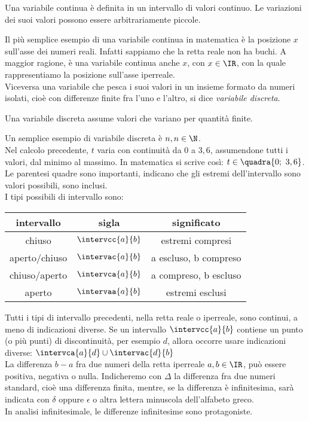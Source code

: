 \begin{definizione}
 Una variabile continua è definita in un intervallo di valori continuo.
 Le variazioni dei suoi valori possono essere arbitrariamente piccole.
\end{definizione}

Il più semplice esempio di una variabile continua in matematica è la 
posizione $x$ sull'asse dei numeri reali. Infatti sappiamo che la retta reale 
non
ha buchi. A maggior ragione, è una variabile continua anche $x$, con $x\in\IR$,
con la quale rappresentiamo la posizione sull'asse iperreale. \\
Viceversa una variabile che pesca i suoi valori in un insieme formato da 
numeri isolati,
cioè con differenze finite fra l'uno e l'altro, si dice \emph{variabile 
discreta}. 
\begin{definizione}
 Una variabile discreta assume valori che variano per quantità finite.
\end{definizione}

Un semplice esempio di variabile discreta è $n, n\in \N$.\\
Nel calcolo precedente, $t$ varia con continuità da $0$ a $3,6$,
assumendone tutti i valori, dal minimo al massimo. In matematica si scrive 
così:
\(t\in \quadra{0;\ 3,6}\). Le parentesi quadre sono importanti, indicano che 
gli estremi
dell'intervallo sono valori possibili, sono inclusi.\\
I tipi possibili di intervallo sono:

\begin{center}
\begin{tabular}{ccc}\toprule
intervallo & sigla & significato\\\midrule
chiuso &$\intervcc{a}{b}$  & estremi compresi\\
aperto/chiuso & $\intervac{a}{b}$ & a escluso, b compreso\\
chiuso/aperto & $\intervca{a}{b}$ & a compreso, b escluso\\
aperto & $\intervaa{a}{b}$ & estremi esclusi\\\bottomrule
\end{tabular}
\label{tab:diff_tipiinterv}
\end{center}

Tutti i tipi di intervallo precedenti, nella retta reale o iperreale, sono
continui, a meno di indicazioni diverse. Se un intervallo $\intervcc{a}{b}$ 
contiene un punto
(o più punti) di discontinuità, per esempio $d$, allora occorre usare 
indicazioni
diverse: $\intervca{a}{d}\cup\intervac{d}{b}$\\ 
La differenza $b-a$ fra due numeri della retta iperreale $a, b \in \IR$, 
può essere positiva, negativa o nulla. Indicheremo con $\Delta$ la 
differenza fra due numeri standard, cioè una differenza finita, mentre, se la 
differenza è infinitesima, sarà indicata con $\delta$ oppure $\epsilon$
o altra lettera minuscola dell'alfabeto greco.\\
In analisi infinitesimale, le differenze infinitesime sono protagoniste.


